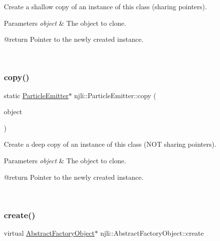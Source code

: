 Create a shallow copy of an instance of this class (sharing pointers).


\begin{DoxyParams}{Parameters}
{\em object} & The object to clone. \begin{DoxyVerb} @return Pointer to the newly created instance.\end{DoxyVerb}
 \\
\hline
\end{DoxyParams}
\mbox{\label{classnjli_1_1_particle_emitter_aa54cb621ed2c6172df40158b0f504e9e}} 
\subsubsection{\texorpdfstring{copy()}{copy()}}
{\footnotesize\ttfamily static \mbox{\hyperlink{classnjli_1_1_particle_emitter}{Particle\+Emitter}}$\ast$ njli\+::\+Particle\+Emitter\+::copy (\begin{DoxyParamCaption}\item[{const \mbox{\hyperlink{classnjli_1_1_particle_emitter}{Particle\+Emitter}} \&}]{object }\end{DoxyParamCaption})\hspace{0.3cm}{\ttfamily [static]}}

Create a deep copy of an instance of this class (N\+OT sharing pointers).


\begin{DoxyParams}{Parameters}
{\em object} & The object to clone. \begin{DoxyVerb} @return Pointer to the newly created instance.\end{DoxyVerb}
 \\
\hline
\end{DoxyParams}
\mbox{\label{classnjli_1_1_particle_emitter_a83a8876ae63b92804004cf3febe76573}} 
\subsubsection{\texorpdfstring{create()}{create()}\hspace{0.1cm}{\footnotesize\ttfamily [1/3]}}
{\footnotesize\ttfamily virtual \mbox{\hyperlink{classnjli_1_1_abstract_factory_object}{Abstract\+Factory\+Object}}$\ast$ njli\+::\+Abstract\+Factory\+Object\+::create}

